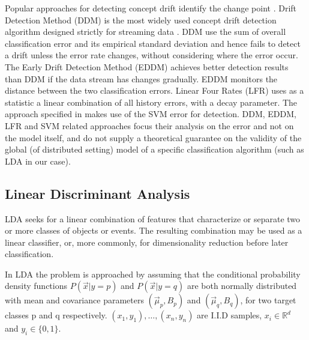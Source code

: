 \documentclass{sig-alternate-05-2015}
\begin{document}
Popular approaches for detecting concept drift identify the change point
\cite{gama2004learning,wang2013concept}. Drift Detection Method (DDM) is the
most widely used concept drift detection algorithm designed strictly for streaming data 
\cite{gama2004learning}. DDM use the sum of overall classification error and 
its empirical standard deviation and hence fails to detect a drift unless the
error rate changes, without considering where the error occur.
The Early Drift Detection Method (EDDM) \cite{baena2006early} achieves better
detection results than DDM if the data stream has changes gradually.
EDDM monitors the distance between the two classification errors. 
Linear Four Rates (LFR) \cite{wang2015concept} uses as a statistic a linear
combination of all history errors, with a decay parameter. The approach 
specified in \cite{klinkenberg2000detecting,dries2009adaptive} makes use of
the SVM error for detection. DDM, EDDM, LFR and SVM related approaches focus
their analysis on the error and not on the model itself, and do not supply a
theoretical guarantee on the validity of the global (of distributed setting) 
model of a specific classification algorithm (such as LDA in our case).
\subsection{Linear Discriminant Analysis}%
LDA seeks for a linear combination of features that
characterize or separate two or more classes of objects or events.
The resulting combination may be used as a linear classifier, or,
more commonly, for dimensionality reduction before later classification.

In LDA the problem is approached by assuming that the conditional probability
density functions $P(\vec x|y=p)$ and $P(\vec x|y=q)$ are both normally distributed with
mean and covariance parameters $\left(\vec \mu_p, B_p\right)$ and
$\left(\vec \mu_q, B_q\right)$, for two target classes p and q respectively.
${(x_1,y_1),\ldots,(x_n,y_n)}$ are I.I.D samples, $x_i \in \mathbb{R}^d$
and $y_i \in \{0,1\}$.
\end{document}
